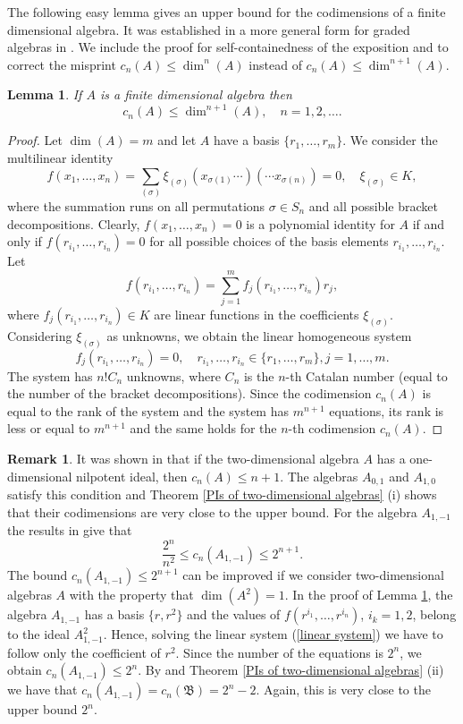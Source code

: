 \documentclass{amsart}[12pt]
\newtheorem{lemma}[theorem]{Lemma}
\theoremstyle{definition}
\newtheorem{remark}[theorem]{Remark}
\begin{document}
The following easy lemma gives an upper bound for the codimensions of a finite dimensional algebra.
It was established in a more general form for graded algebras in \cite{BaD}. We include the proof for self-containedness of the exposition
and to correct the misprint $c_n(A)\leq \dim^n(A)$ instead of $c_n(A)\leq \dim^{n+1}(A)$.

\begin{lemma}\label{growth of codimensions}
If $A$ is a finite dimensional algebra then
\[
c_n(A)\leq \dim^{n+1}(A),\quad n=1,2,\ldots .
\]
\end{lemma}

\begin{proof}
Let $\dim(A)=m$ and let $A$ have a basis $\{r_1,\ldots,r_m\}$. We consider the multilinear identity
\[
f(x_1,\ldots,x_n)=\sum_{(\sigma)}\xi_{(\sigma)}(x_{\sigma(1)}\cdots)(\cdots x_{\sigma(n)})=0,\quad \xi_{(\sigma)}\in K,
\]
where the summation runs on all permutations $\sigma\in S_n$ and all possible bracket decompositions. Clearly, $f(x_1,\ldots,x_n)=0$
is a polynomial identity for $A$ if and only if $f(r_{i_1},\ldots,r_{i_n})=0$ for all possible choices of the basis elements $r_{i_1},\ldots,r_{i_n}$.
Let
\[
f(r_{i_1},\ldots,r_{i_n})=\sum_{j=1}^mf_j(r_{i_1},\ldots,r_{i_n})r_j,
\]
where $f_j(r_{i_1},\ldots,r_{i_n})\in K$ are linear functions in the coefficients $\xi_{(\sigma)}$.
Considering $\xi_{(\sigma)}$ as unknowns, we obtain the linear homogeneous system
\begin{equation}\label{linear system}
f_j(r_{i_1},\ldots,r_{i_n})=0,\quad r_{i_1},\ldots,r_{i_n}\in\{r_1,\ldots,r_m\},j=1,\ldots,m.
\end{equation}
The system has $n!C_n$ unknowns, where $C_n$ is the $n$-th Catalan number (equal to the number of the bracket decompositions).
Since the codimension $c_n(A)$ is equal to the rank of the system and the system has $m^{n+1}$ equations, its rank is less or equal to $m^{n+1}$
and the same holds for the $n$-th codimension $c_n(A)$.
\end{proof}

\begin{remark}
It was shown in \cite{GMZ} that if the two-dimensional algebra $A$ has a one-dimensional nilpotent ideal, then
$c_n(A)\leq n+1$. The algebras $A_{0,1}$ and $A_{1,0}$ satisfy this condition and Theorem \ref{PIs of two-dimensional algebras} (i) shows that
their codimensions are very close to the upper bound. For the algebra $A_{1,-1}$ the results in \cite{GMZ} give that
\[
\frac{2^n}{n^2}\leq c_n(A_{1,-1})\leq 2^{n+1}.
\]
The bound $c_n(A_{1,-1})\leq 2^{n+1}$ can be improved if we consider two-dimensional algebras $A$ with the property that $\dim(A^2)=1$.
In the proof of Lemma \ref{growth of codimensions}, the algebra $A_{1,-1}$ has a basis $\{r,r^2\}$
and the values of $f(r^{i_1},\ldots,r^{i_n})$, $i_k=1,2$, belong to the ideal $A_{1,-1}^2$.
Hence, solving the linear system (\ref{linear system}) we have to follow only the coefficient of $r^2$.
Since the number of the equations is $2^n$, we obtain $c_n(A_{1,-1})\leq 2^n$.
By \cite{DIT} and Theorem \ref{PIs of two-dimensional algebras} (ii) we have that $c_n(A_{1,-1})=c_n({\mathfrak B})=2^n-2$.
Again, this is very close to the upper bound $2^n$.
\end{remark}
\end{document}
